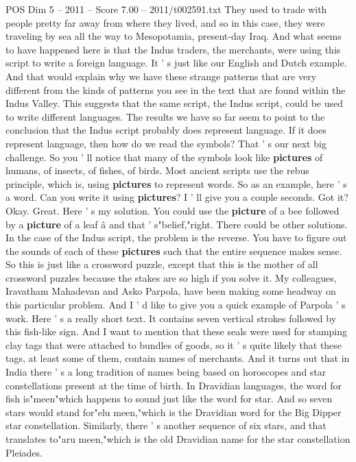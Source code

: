 \begin{textsample}{POS Dim 5 – 2011 – Score 7.00 – 2011/t002591.txt}
They used to trade with people pretty far away from where they lived, and so in this case, they were traveling by sea all the way to Mesopotamia, present-day Iraq.
And what seems to have happened here is that the Indus traders, the merchants, were using this script to write a foreign language.
It ' s just like our English and Dutch example.
And that would explain why we have these strange patterns that are very different from the kinds of patterns you see in the text that are found within the Indus Valley.
This suggests that the same script, the Indus script, could be used to write different languages.
The results we have so far seem to point to the conclusion that the Indus script probably does represent language.
If it does represent language, then how do we read the symbols?
That ' s our next big challenge.
So you ' ll notice that many of the symbols look like \textbf{pictures} of humans, of insects, of fishes, of birds.
Most ancient scripts use the rebus principle, which is, using \textbf{pictures} to represent words.
So as an example, here ' s a word.
Can you write it using \textbf{pictures}?
I ' ll give you a couple seconds.
Got it?
Okay.
Great.
Here ' s my solution.
You could use the \textbf{picture} of a bee followed by a \textbf{picture} of a leaf â and that ' s"belief,"right.
There could be other solutions.
In the case of the Indus script, the problem is the reverse.
You have to figure out the sounds of each of these \textbf{pictures} such that the entire sequence makes sense.
So this is just like a crossword puzzle, except that this is the mother of all crossword puzzles because the stakes are so high if you solve it.
My colleagues, Iravatham Mahadevan and Asko Parpola, have been making some headway on this particular problem.
And I ' d like to give you a quick example of Parpola ' s work.
Here ' s a really short text.
It contains seven vertical strokes followed by this fish-like sign.
And I want to mention that these seals were used for stamping clay tags that were attached to bundles of goods, so it ' s quite likely that these tags, at least some of them, contain names of merchants.
And it turns out that in India there ' s a long tradition of names being based on horoscopes and star constellations present at the time of birth.
In Dravidian languages, the word for fish is"meen"which happens to sound just like the word for star.
And so seven stars would stand for"elu meen,"which is the Dravidian word for the Big Dipper star constellation.
Similarly, there ' s another sequence of six stars, and that translates to"aru meen,"which is the old Dravidian name for the star constellation Pleiades.

\end{textsample}

